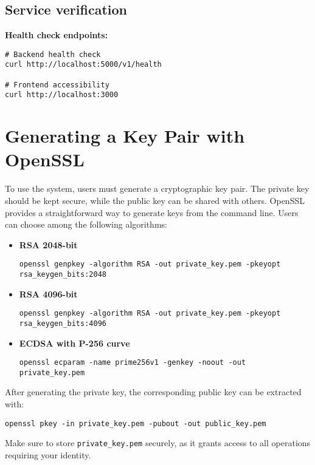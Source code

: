 \subsection{Service verification}

\textbf{Health check endpoints:}
\begin{verbatim}
# Backend health check
curl http://localhost:5000/v1/health

# Frontend accessibility
curl http://localhost:3000
\end{verbatim}

\section{Generating a Key Pair with OpenSSL}

To use the system, users must generate a cryptographic key pair. 
The private key should be kept secure, while the public key can be shared with others. 
OpenSSL provides a straightforward way to generate keys from the command line. 
Users can choose among the following algorithms:

\begin{itemize}
    \item \textbf{RSA 2048-bit}
    \begin{verbatim}
openssl genpkey -algorithm RSA -out private_key.pem -pkeyopt rsa_keygen_bits:2048
    \end{verbatim}

    \item \textbf{RSA 4096-bit}
    \begin{verbatim}
openssl genpkey -algorithm RSA -out private_key.pem -pkeyopt rsa_keygen_bits:4096
    \end{verbatim}

    \item \textbf{ECDSA with P-256 curve}
    \begin{verbatim}
openssl ecparam -name prime256v1 -genkey -noout -out private_key.pem
    \end{verbatim}
\end{itemize}
After generating the private key, the corresponding public key can be extracted with:

\begin{verbatim}
openssl pkey -in private_key.pem -pubout -out public_key.pem
\end{verbatim}
Make sure to store \texttt{private\_key.pem} securely, as it grants access to all operations requiring your identity.
